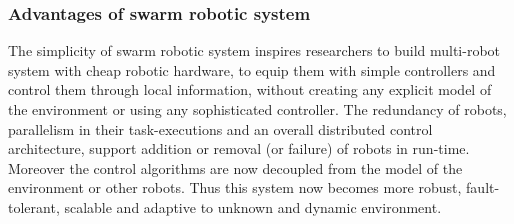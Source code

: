 \subsubsection*{Advantages of swarm robotic system} 
The simplicity of swarm robotic system inspires researchers to build multi-robot system with cheap robotic hardware, to equip them with simple controllers and control them through local information, without creating any explicit model of the environment or using any sophisticated  controller. The redundancy of robots, parallelism in their task-executions and an overall distributed control architecture, support addition or removal (or failure) of robots in run-time. Moreover the control algorithms are now decoupled from the model of the environment or other robots. Thus this system now becomes more robust, fault-tolerant, scalable and adaptive to unknown and dynamic environment.
